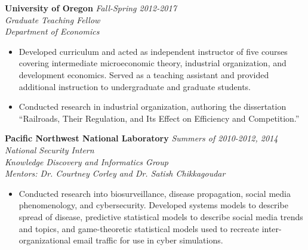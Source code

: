 \documentclass[11pt]{article}
\newenvironment{changemargin}[2]{%
  \begin{list}{}{%
    \setlength{\topsep}{0pt}%
    \setlength{\leftmargin}{#1}%
    \setlength{\rightmargin}{#2}%
    \setlength{\listparindent}{\parindent}%
    \setlength{\itemindent}{\parindent}%
    \setlength{\parsep}{\parskip}%
  }%
  \item[]}{\end{list}
}
\newenvironment{body} {
	\vspace*{-16pt}
	\begin{changemargin}{-0.25in}{-0.5in}
  }	
	{\end{changemargin}
}
\begin{document}
\begin{body}
	
	\textbf{University of Oregon} \hfill \emph{Fall-Spring 2012-2017}\\
	\emph{Graduate Teaching Fellow}\\
	\emph{Department of Economics}
	\vspace*{-4pt}
	\begin{itemize}
		\item Developed curriculum and acted as independent instructor of five courses covering intermediate microeconomic theory, industrial organization, and development economics. Served as a teaching assistant and provided additional instruction to undergraduate and graduate students.
		\item Conducted research in industrial organization, authoring the dissertation ``Railroads, Their Regulation, and Its Effect on Efficiency and Competition.''
	\end{itemize}

	\textbf{Pacific Northwest National Laboratory}  \hfill \emph{Summers of 2010-2012, 2014}\\
	\emph{National Security Intern}\\ 
	\emph{Knowledge Discovery and Informatics Group}\\
	\emph{Mentors: Dr. Courtney Corley and Dr. Satish Chikkagoudar}
	\vspace*{-4pt}
	\begin{itemize}	
		\item Conducted research into biosurveillance, disease propagation, social media phenomenology, and cybersecurity. Developed systems models to describe spread of disease, predictive statistical models to describe social media trends and topics, and game-theoretic statistical models used to recreate inter-organizational email traffic for use in cyber simulations.
	\end{itemize}
				
\end{body}
\end{document}

